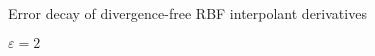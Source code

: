 \documentclass{beamer}
\begin{document}
\begin{frame}{Error decay of divergence-free RBF interpolant derivatives}
  \begin{center}
    $\varepsilon = 2$
  \end{center}
\end{frame}
\end{document}
